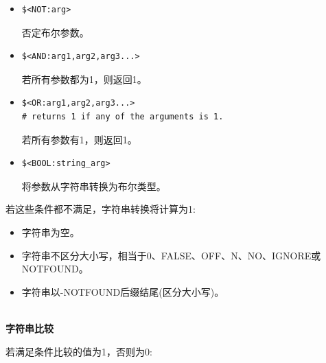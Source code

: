 \begin{itemize}
\item 
\begin{lstlisting}[style=styleCMake]
$<NOT:arg> 
\end{lstlisting}

否定布尔参数。

\item 
\begin{lstlisting}[style=styleCMake]
$<AND:arg1,arg2,arg3...> 
\end{lstlisting}

若所有参数都为1，则返回1。

\item 
\begin{lstlisting}[style=styleCMake]
$<OR:arg1,arg2,arg3...> 
# returns 1 if any of the arguments is 1.
\end{lstlisting}

若所有参数有1，则返回1。

\item 
\begin{lstlisting}[style=styleCMake]
$<BOOL:string_arg> 
\end{lstlisting}

将参数从字符串转换为布尔类型。
\end{itemize}

若这些条件都不满足，字符串转换将计算为1:

\begin{itemize}
\item 
字符串为空。

\item 
字符串不区分大小写，相当于0、FALSE、OFF、N、NO、IGNORE或NOTFOUND。

\item 
字符串以-NOTFOUND后缀结尾(区分大小写)。
\end{itemize}

\hspace*{\fill} \\ %
\noindent
\textbf{字符串比较}

若满足条件比较的值为1，否则为0:

